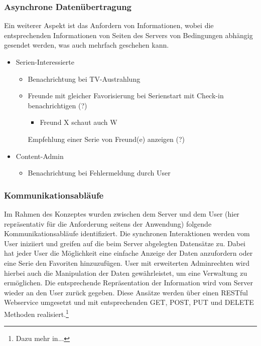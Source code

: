 \subsubsection{Asynchrone Datenübertragung}

Ein weiterer Aspekt ist das Anfordern von Informationen, wobei die entsprechenden Informationen von Seiten des Servers von Bedingungen abhängig gesendet werden, was auch mehrfach geschehen kann.

\begin{itemize}
\item
Serien-Interessierte
  \begin{itemize}
  \item
    Benachrichtung bei TV-Austrahlung
    \item
    Freunde mit gleicher Favorisierung bei Serienstart mit Check-in benachrichtigen (?)
      \begin{itemize}
      \item
         Freund X schaut auch W
         \end{itemize}
    Empfehlung einer Serie von Freund(e) anzeigen (?)
    \end{itemize}
\item
Content-Admin
  \begin{itemize}
  \item
    Benachrichtung bei Fehlermeldung durch User
    \end{itemize}
\end{itemize}

\subsubsection{Kommunikationsabläufe}
Im Rahmen des Konzeptes wurden zwischen dem Server und dem User (hier repräsentativ für die Anforderung seitens der Anwendung) folgende Kommunikationsabläufe identifiziert.
Die synchronen Interaktionen werden vom User iniziiert und greifen auf die beim Server abgelegten Datensätze zu. Dabei hat jeder User die Möglichkeit eine einfache Anzeige der Daten anzufordern oder eine Serie den Favoriten hinzuzufügen. User mit erweiterten Adminrechten wird hierbei auch die Manipulation der Daten gewährleistet, um eine Verwaltung zu ermöglichen. Die entsprechende Repräsentation der Information wird vom Server wieder an den User zurück gegeben.
Diese Ansätze werden über einen RESTful Webservice umgesetzt und mit entsprechenden GET, POST, PUT und DELETE Methoden realisiert.\footnote[2]{Dazu mehr in...}

